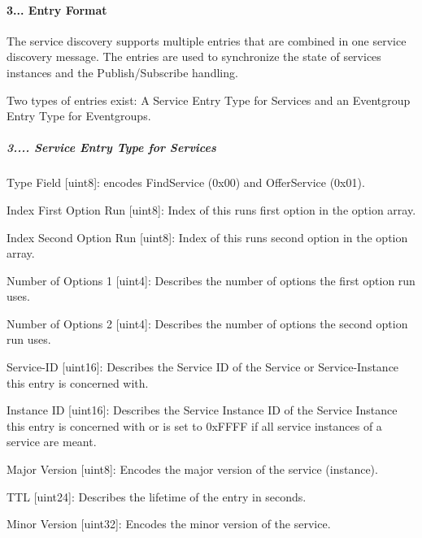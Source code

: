 \paragraph*{3... Entry Format}


\begin{DoxyItemize}
\item The service discovery supports multiple entries that are combined in one service discovery message. The entries are used to synchronize the state of services instances and the Publish/\+Subscribe handling.
\item Two types of entries exist\+: A Service Entry Type for Services and an Eventgroup Entry Type for Eventgroups.
\end{DoxyItemize}

\subparagraph*{3.... Service Entry Type for Services}


\begin{DoxyItemize}
\item Type Field \mbox{[}uint8\mbox{]}\+: encodes Find\+Service (0x00) and Offer\+Service (0x01).
\item Index First Option Run \mbox{[}uint8\mbox{]}\+: Index of this runs first option in the option array.
\item Index Second Option Run \mbox{[}uint8\mbox{]}\+: Index of this runs second option in the option array.
\item Number of Options 1 \mbox{[}uint4\mbox{]}\+: Describes the number of options the first option run uses.
\item Number of Options 2 \mbox{[}uint4\mbox{]}\+: Describes the number of options the second option run uses.
\item Service-\/\+ID \mbox{[}uint16\mbox{]}\+: Describes the Service ID of the Service or Service-\/\+Instance this entry is concerned with.
\item Instance ID \mbox{[}uint16\mbox{]}\+: Describes the Service Instance ID of the Service Instance this entry is concerned with or is set to 0x\+F\+F\+FF if all service instances of a service are meant.
\item Major Version \mbox{[}uint8\mbox{]}\+: Encodes the major version of the service (instance).
\item T\+TL \mbox{[}uint24\mbox{]}\+: Describes the lifetime of the entry in seconds.
\item Minor Version \mbox{[}uint32\mbox{]}\+: Encodes the minor version of the service.
\end{DoxyItemize}

